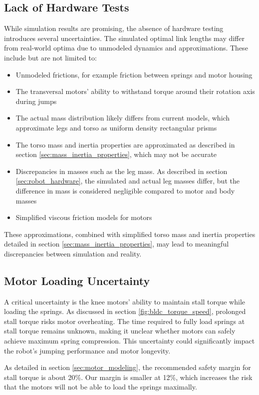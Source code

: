 \subsection{Lack of Hardware Tests}
While simulation results are promising, the absence of hardware testing introduces several uncertainties. The simulated optimal link lengths may differ from real-world optima due to unmodeled dynamics and approximations. These include but are not limited to: 
\begin{itemize}
    \item Unmodeled frictions, for example friction between springs and motor housing
    \item The transversal motors' ability to withstand torque around their rotation axis during jumps
    \item The actual mass distribution likely differs from current models, which approximate legs and torso as uniform density rectangular prisms
    \item The torso mass and inertia properties are approximated as described in section \ref{sec:mass_inertia_properties}, which may not be accurate
    \item Discrepancies in masses such as the leg mass. As described in section \ref{sec:robot_hardware}, the simulated and actual leg masses differ, but the difference in mass is considered negligible compared to motor and body masses
    \item Simplified viscous friction models for motors
\end{itemize}

These approximations, combined with simplified torso mass and inertia properties detailed in section \ref{sec:mass_inertia_properties}, may lead to meaningful discrepancies between simulation and reality.

\subsection{Motor Loading Uncertainty}
A critical uncertainty is the knee motors' ability to maintain stall torque while loading the springs. As discussed in section \ref{fig:bldc_torque_speed}, prolonged stall torque risks motor overheating. The time required to fully load springs at stall torque remains unknown, making it unclear whether motors can safely achieve maximum spring compression. This uncertainty could significantly impact the robot's jumping performance and motor longevity.

As detailed in section \ref{sec:motor_modeling}, the recommended safety margin for stall torque is about 20\%. Our margin is smaller at 12\%, which increases the risk that the motors will not be able to load the springs maximally.

